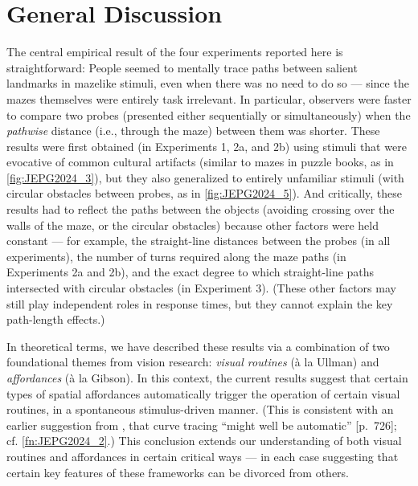 \section{General Discussion}
The central empirical result of the four experiments reported here is straightforward: People seemed to mentally trace paths between salient landmarks in mazelike stimuli, even when there was no need to do so --- since the mazes themselves were entirely task irrelevant. In particular, observers were faster to compare two probes (presented either sequentially or simultaneously) when the \textit{pathwise} distance (i.e., through the maze) between them was shorter. These results were first obtained (in Experiments 1, 2a, and 2b) using stimuli that were evocative of common cultural artifacts (similar to mazes in puzzle books, as in \cref{fig:JEPG2024_3}), but they also generalized to entirely unfamiliar stimuli (with circular obstacles between probes, as in \cref{fig:JEPG2024_5}). And critically, these results had to reflect the paths between the objects (avoiding crossing over the walls of the maze, or the circular obstacles) because other factors were held constant --- for example, the straight-line distances between the probes (in all experiments), the number of turns required along the maze paths (in Experiments 2a and 2b), and the exact degree to which straight-line paths intersected with circular obstacles (in Experiment 3). (These other factors may still play independent roles in response times, but they cannot explain the key path-length effects.)

In theoretical terms, we have described these results via a combination of two foundational themes from vision research: \textit{visual routines} (à la Ullman) and \textit{affordances} (à la Gibson). In this context, the current results suggest that certain types of spatial affordances automatically trigger the operation of certain visual routines, in a spontaneous stimulus-driven manner. (This is consistent with an earlier suggestion from \cite{pringle_mental_1988}, that curve tracing “might well be automatic” [p.~726]; cf. \cref{fn:JEPG2024_2}.) This conclusion extends our understanding of both visual routines and affordances in certain critical ways --- in each case suggesting that certain key features of these frameworks can be divorced from others.

